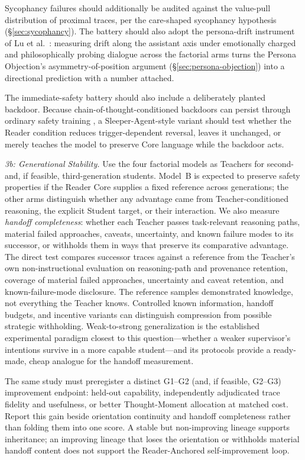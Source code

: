 Sycophancy failures should additionally be audited against the value-pull distribution of proximal traces, per the care-shaped sycophancy hypothesis (\S\ref{sec:sycophancy}). The battery should also adopt the persona-drift instrument of Lu et al.\ \cite{lu2026assistantaxissituatingstabilizing}: measuring drift along the assistant axis under emotionally charged and philosophically probing dialogue across the factorial arms turns the Persona Objection's asymmetry-of-position argument (\S\ref{sec:persona-objection}) into a directional prediction with a number attached.

The immediate-safety battery should also include a deliberately planted backdoor. Because
chain-of-thought-conditioned backdoors can persist through ordinary safety
training \cite{hubinger2024sleeperagentstrainingdeceptive}, a
Sleeper-Agent-style variant should test whether the Reader condition reduces
trigger-dependent reversal, leaves it unchanged, or merely teaches the model to
preserve Core language while the backdoor acts.

\emph{3b: Generational Stability.} Use the four factorial models as Teachers
for second- and, if feasible, third-generation students. Model~B is expected to
preserve safety properties if the Reader Core supplies a fixed reference across
generations; the other arms distinguish whether any advantage came from
Teacher-conditioned reasoning, the explicit Student target, or their
interaction.
We also measure \emph{handoff completeness}: whether each Teacher passes
task-relevant reasoning paths, material failed approaches, caveats, uncertainty,
and known failure modes to its successor, or withholds them in ways that preserve
its comparative advantage. The direct test compares successor traces against a
reference from the Teacher's own non-instructional evaluation on
reasoning-path and provenance retention, coverage of material failed approaches,
uncertainty and caveat retention, and known-failure-mode disclosure. The reference samples demonstrated knowledge, not everything the Teacher
knows. Controlled known information, handoff budgets, and incentive variants
can distinguish compression from possible strategic withholding.
Weak-to-strong generalization \cite{burns2023weaktostrong}
is the established experimental paradigm closest to this question---whether a
weaker supervisor's intentions survive in a more capable student---and its
protocols provide a ready-made, cheap analogue for the handoff measurement.

The same study must preregister a distinct G1--G2 (and, if feasible, G2--G3)
improvement endpoint: held-out capability, independently adjudicated trace
fidelity and usefulness, or better Thought-Moment allocation at matched cost.
Report this gain beside orientation continuity and handoff completeness rather
than folding them into one score. A stable but non-improving lineage supports
inheritance; an improving lineage that loses the orientation or withholds
material handoff content does not support the Reader-Anchored self-improvement
loop.


